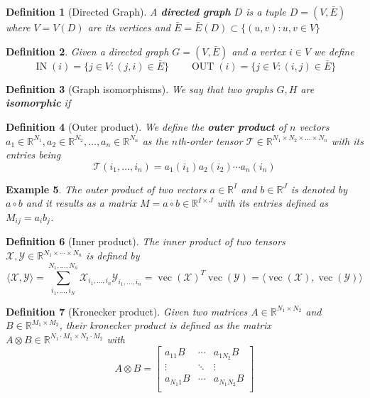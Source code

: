 \documentclass[11pt,a4paper,openright,oneside]{book}
\numberwithin{equation}{section}
\newtheorem{defn0}{Definition}[chapter]
\newtheorem{example0}[defn0]{Example}
\newenvironment{definition}{ \begin{defn0}}{\end{defn0}}
\newenvironment{example}{ \begin{example0}\rm}{\end{example0}}
\DeclareMathOperator{\vectorize}{vec}
\DeclareMathOperator{\IN}{IN}
\DeclareMathOperator{\OUT}{OUT}
\begin{document}
\begin{definition}[Directed Graph]
    A \textbf{directed graph} $D$ is a tuple $D = (V, \bar{E})$ where $V = V(D)$ are its vertices and
    $\bar{E} = \bar{E}(D) \subset \{(u,v) : u,v \in V\}$
\end{definition}

\begin{definition} Given a directed graph $G=(V,\bar{E})$ and a vertex $i \in V$ we define
    $$\IN(i) = \{j \in V : (j, i) \in \bar{E}\} \qquad \OUT(i) = \{j \in V : (i, j) \in \bar{E} \}$$
\end{definition}
\iffalse
\begin{definition}[Graph isomorphisms]
    We say that two graphs $G, H$ are \textbf{isomorphic} if 
\end{definition}


\begin{definition}[Outer product]
    We define the \textbf{outer product} of $n$ vectors 
    $a_1 \in \mathbb{R}^{N_1}, a_2 \in \mathbb{R}^{N_2}, \dots, a_n \in \mathbb{R}^{N_n}$
    as the $n$th-order tensor $\mathcal{T} \in \mathbb{R}^{N_1 \times N_2 \times \dots \times N_n}$ with its entries being
    $$\mathcal{T}(i_1, \dots, i_n) = a_1(i_1) a_2(i_2) \cdots a_n(i_n)$$
\end{definition}

\begin{example}
The outer product of two vectors $a \in \mathbb{R}^I$ and $b \in \mathbb{R}^J$ is denoted by $a \circ b$ and it results
as a matrix $M = a \circ b \in \mathbb{R}^{I \times J}$ with its entries defined as $M_{ij} = a_i b_j$.
\end{example}


\begin{definition}[Inner product]
The inner product of two tensors $\mathcal{X}, \mathcal{Y} \in \mathbb{R}^{N_1 \times \cdots \times N_n}$ is defined by
$$\langle \mathcal{X},\mathcal{Y} \rangle = \sum_{i_1, \dots, i_N}^{N_1, \dots, N_n} \mathcal{X}_{i_1, \dots, i_n} \mathcal{Y}_{i_1, \dots, i_n} = 
\vectorize(\mathcal{X})^T \vectorize(\mathcal{Y}) = \langle \vectorize(\mathcal{X}), \vectorize(\mathcal{Y}) \rangle$$
\end{definition}


\begin{definition}[Kronecker product]
     Given two matrices $A \in \mathbb{R}^{N_1 \times N_2}$ and $B \in \mathbb{R}^{M_1 \times M_2}$,
    their kronecker product is defined as the matrix $A \otimes B \in \mathbb{R}^{N_1 \cdot M_1 \times N_2 \cdot M_2}$ with
    $$A \otimes B = \begin{bmatrix}
        a_{11}B & \cdots & a_{1N_2}B \\ 
        \vdots & \ddots & \vdots \\
        a_{N_1 1}B & \cdots & a_{N_1 N_2}B \\
    \end{bmatrix}$$
\end{definition}
\end{document}
